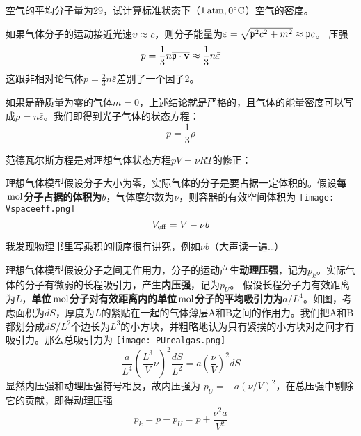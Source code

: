 \documentclass[CJK]{beamer}
\begin{document}
\begin{frame}
\bch
空气的平均分子量为29，试计算标准状态下（$1\,\mathrm{atm}, 0^\circ \mathrm{C}$）空气的密度。
\ech
\end{frame}

\begin{frame}
\bch
{\small
如果气体分子的运动接近光速$\upsilon \approx c$，则分子能量为$\varepsilon = \sqrt{{\mathfrak{p}}^2c^2 + m^2}\approx {\mathfrak{p}} c$。
压强
$$ p = \frac{1}{3}n \overline{{\mathfrak{p}}\cdot {\mathbf{v}}} \approx \frac{1}{3} n \bar{\varepsilon}$$
这跟非相对论气体$p = \frac{2}{3}n \bar{\varepsilon}$差别了一个因子2。

如果是静质量为零的气体$m=0$，上述结论就是严格的，且气体的能量密度可以写成$\rho = n\bar{\varepsilon}$。我们即得到光子气体的状态方程：
$$p = \frac{1}{3}\rho$$
}
\ech
\end{frame}

\begin{frame}
\bch
范德瓦尔斯方程是对理想气体状态方程$pV = \nu RT$的修正：
\bitem
\item{理想气体模型假设分子大小为零，实际气体的分子是要占据一定体积的。假设{\bf 每$\,\mathrm{mol}$分子占据的体积为$b$}，气体摩尔数为$\nu$，则容器的有效空间体积为
\texttt{[image: Vspaceeff.png]}
\emini
{}
$$ V_{\rm eff} = V - \nu b$$

\skipline

我发现物理书里写乘积的顺序很有讲究，例如$\nu b$（大声读一遍…）
\emini
}
\eitem
\ech
\end{frame}




\begin{frame}
\bch
\bitem
\item{\small 理想气体模型假设分子之间无作用力，分子的运动产生{\bf 动理压强}，记为$p_k$。实际气体的分子有微弱的长程吸引力，产生{\bf 内压强}，记为$p_U$。
假设长程分子力有效距离为$L$，{\bf 单位$\,\mathrm{mol}$分子对有效距离内的单位$\,\mathrm{mol}$分子的平均吸引力为$a/L^4$}。如图，考虑面积为$dS$，厚度为$L$的紧贴在一起的气体薄层A和B之间的作用力。我们把A和B都划分成$dS/L^2$个边长为$L^3$的小方块，并粗略地认为只有紧挨的小方块对之间才有吸引力。那么总吸引力为}
\eitem
{}
\texttt{[image: PUrealgas.png]}
\emini
{}
{\small  
$$ \frac{a}{L^4}\left(\frac{L^3}{V}\nu\right)^2 \frac{dS}{L^2} = a \left(\frac{\nu}{V}\right)^2 dS$$
显然内压强和动理压强符号相反，故内压强为 $p_U = - a(\nu/V)^2$，在总压强中剔除它的贡献，即得动理压强
$$p_k = p - p_U = p + \frac{\nu^2 a}{V^2}$$
}
\emini
\ech
\end{frame}
\end{document}
